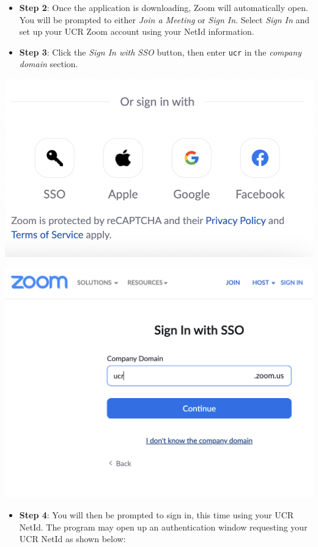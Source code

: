 \documentclass[
]{book}
\providecommand{\tightlist}{%
  \setlength{\itemsep}{0pt}\setlength{\parskip}{0pt}}
\begin{document}
\begin{itemize}
\item
  \textbf{Step 2}: Once the application is downloading, Zoom will automatically open. You will be prompted to either \emph{Join a Meeting} or \emph{Sign In}. Select \emph{Sign In} and set up your UCR Zoom account using your NetId information.
\item
  \textbf{Step 3}: Click the \emph{Sign In with SSO} button, then enter \texttt{ucr} in the \emph{company domain} section.
\end{itemize}

\begin{center}\includegraphics[width=0.6\linewidth]{images/zoomsso} \end{center}

\begin{center}\includegraphics[width=0.75\linewidth]{images/zoomdomain} \end{center}

\begin{itemize}
\tightlist
\item
  \textbf{Step 4}: You will then be prompted to sign in, this time using your UCR NetId. The program may open up an authentication window requesting your UCR NetId as shown below:
\end{itemize}
\end{document}
